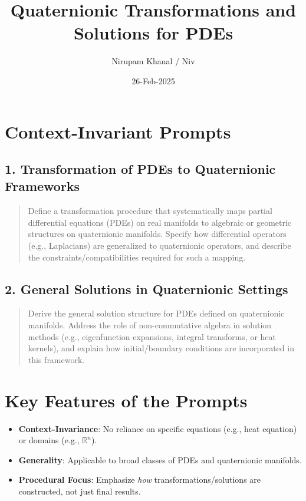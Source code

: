 \documentclass{article}
\title{Quaternionic Transformations and Solutions for PDEs}
\author{Nirupam Khanal / Niv}
\date{26-Feb-2025}
\begin{document}
\maketitle

\tableofcontents 


\section{Context-Invariant Prompts}

\subsection{1. Transformation of PDEs to Quaternionic Frameworks}
\begin{quote}
Define a transformation procedure that systematically maps partial differential equations (PDEs) on real manifolds to algebraic or geometric structures on quaternionic manifolds. Specify how differential operators (e.g., Laplacians) are generalized to quaternionic operators, and describe the constraints/compatibilities required for such a mapping.
\end{quote}

\subsection{2. General Solutions in Quaternionic Settings}
\begin{quote}
Derive the general solution structure for PDEs defined on quaternionic manifolds. Address the role of non-commutative algebra in solution methods (e.g., eigenfunction expansions, integral transforms, or heat kernels), and explain how initial/boundary conditions are incorporated in this framework.
\end{quote}

\section{Key Features of the Prompts}
\begin{itemize}
    \item \textbf{Context-Invariance}: No reliance on specific equations (e.g., heat equation) or domains (e.g., \(\mathbb{R}^n\)).
    \item \textbf{Generality}: Applicable to broad classes of PDEs and quaternionic manifolds.
    \item \textbf{Procedural Focus}: Emphasize \textit{how} transformations/solutions are constructed, not just final results.
\end{itemize}
\end{document}
